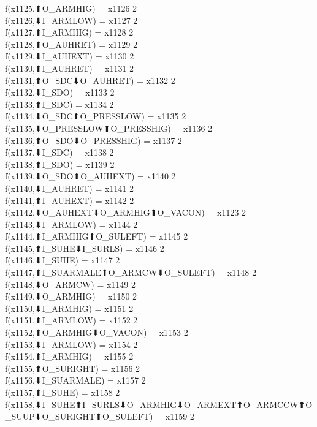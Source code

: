 f(x1125,⬆O_ARMHIG) = x1126 {2} \\
f(x1126,⬇I_ARMLOW) = x1127 {2} \\
f(x1127,⬆I_ARMHIG) = x1128 {2} \\
f(x1128,⬆O_AUHRET) = x1129 {2} \\
f(x1129,⬇I_AUHEXT) = x1130 {2} \\
f(x1130,⬆I_AUHRET) = x1131 {2} \\
f(x1131,⬆O_SDC⬇O_AUHRET) = x1132 {2} \\
f(x1132,⬇I_SDO) = x1133 {2} \\
f(x1133,⬆I_SDC) = x1134 {2} \\
f(x1134,⬇O_SDC⬆O_PRESSLOW) = x1135 {2} \\
f(x1135,⬇O_PRESSLOW⬆O_PRESSHIG) = x1136 {2} \\
f(x1136,⬆O_SDO⬇O_PRESSHIG) = x1137 {2} \\
f(x1137,⬇I_SDC) = x1138 {2} \\
f(x1138,⬆I_SDO) = x1139 {2} \\
f(x1139,⬇O_SDO⬆O_AUHEXT) = x1140 {2} \\
f(x1140,⬇I_AUHRET) = x1141 {2} \\
f(x1141,⬆I_AUHEXT) = x1142 {2} \\
f(x1142,⬇O_AUHEXT⬇O_ARMHIG⬆O_VACON) = x1123 {2} \\
f(x1143,⬇I_ARMLOW) = x1144 {2} \\
f(x1144,⬆I_ARMHIG⬆O_SULEFT) = x1145 {2} \\
f(x1145,⬆I_SUHE⬇I_SURLS) = x1146 {2} \\
f(x1146,⬇I_SUHE) = x1147 {2} \\
f(x1147,⬆I_SUARMALE⬆O_ARMCW⬇O_SULEFT) = x1148 {2} \\
f(x1148,⬇O_ARMCW) = x1149 {2} \\
f(x1149,⬇O_ARMHIG) = x1150 {2} \\
f(x1150,⬇I_ARMHIG) = x1151 {2} \\
f(x1151,⬆I_ARMLOW) = x1152 {2} \\
f(x1152,⬆O_ARMHIG⬇O_VACON) = x1153 {2} \\
f(x1153,⬇I_ARMLOW) = x1154 {2} \\
f(x1154,⬆I_ARMHIG) = x1155 {2} \\
f(x1155,⬆O_SURIGHT) = x1156 {2} \\
f(x1156,⬇I_SUARMALE) = x1157 {2} \\
f(x1157,⬆I_SUHE) = x1158 {2} \\
f(x1158,⬇I_SUHE⬆I_SURLS⬇O_ARMHIG⬇O_ARMEXT⬆O_ARMCCW⬆O_SUUP⬇O_SURIGHT⬆O_SULEFT) = x1159 {2} \\
